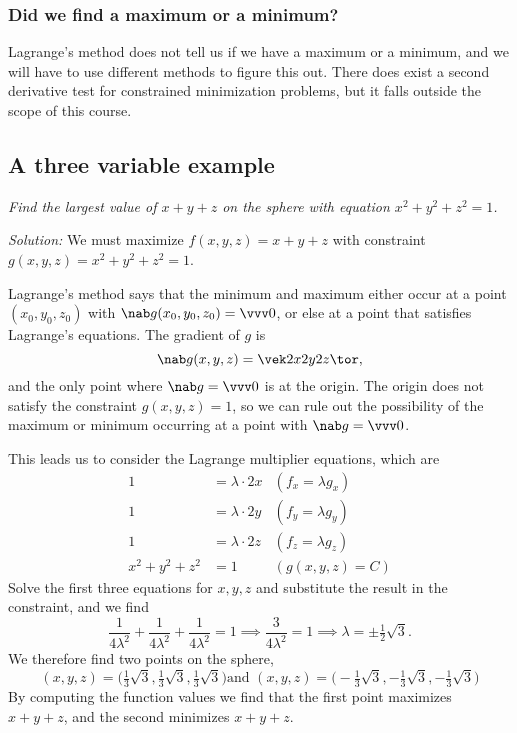 \subsubsection*{Did we find a maximum or a minimum?}
Lagrange's method does not tell us if
we have a maximum or a minimum, and we will have to use different methods to figure
this out.  There does exist a second derivative test for constrained minimization
problems, but it falls outside the scope of this course.

\subsection{A three variable example}  
\textit{Find the largest value of $x+y+z$ on the sphere with equation $x^2 + y^2 +
  z^2 = 1$.}

\textit{Solution: } We must maximize $f(x, y, z) = x+y+z$ with constraint $g(x, y,
z)= x^2 + y^2 + z^2 = 1$.

Lagrange's method says that the minimum and maximum either occur at a point $(x_0,
y_0, z_0)$ with $\nab g(x_0, y_0, z_0) = \vvv0$, or else at a point that satisfies
Lagrange's equations.  The gradient of $g$ is
\[
\nab g(x, y, z) = \vek 2x\\2y\\2z\tor,
\]
and the only point where $\nab g = \vvv0$ is at the origin.  The origin does not
satisfy the constraint $g(x, y, z) = 1$, so we can rule out the possibility of the
maximum or minimum occurring at a point with $\nab g=\vvv 0$.

This leads us to consider the Lagrange multiplier equations, which are
\begin{align*}
  1& = \lambda\cdot 2x &(f_x=\lambda g_x)\\
  1& = \lambda\cdot 2y&(f_y=\lambda g_y)\\
  1& = \lambda\cdot 2z&(f_z=\lambda g_z)\\
  x^2 + y^2 + z^2&=1&(g(x, y, z) = C)
\end{align*}
Solve the first three equations for $x, y, z$ and substitute the result in the
constraint, and we find
\[
\frac{1}{4\lambda^2} + \frac{1}{4\lambda^2} + \frac{1}{4\lambda^2} =1 \implies
\frac{3}{4\lambda^2}=1 \implies \lambda = \pm\tfrac12\sqrt{3}.
\]
We therefore find two points on the sphere,
\[
(x, y, z) = \bigl(\tfrac13\sqrt{3}, \tfrac13\sqrt{3}, \tfrac13\sqrt{3} \bigr) \text{
  and } (x, y, z) = \bigl(-\tfrac13\sqrt{3}, -\tfrac13\sqrt{3}, -\tfrac13\sqrt{3}
\bigr)
\]
By computing the function values we find that the first point maximizes $x+y+z$, and
the second minimizes $x+y+z$.

